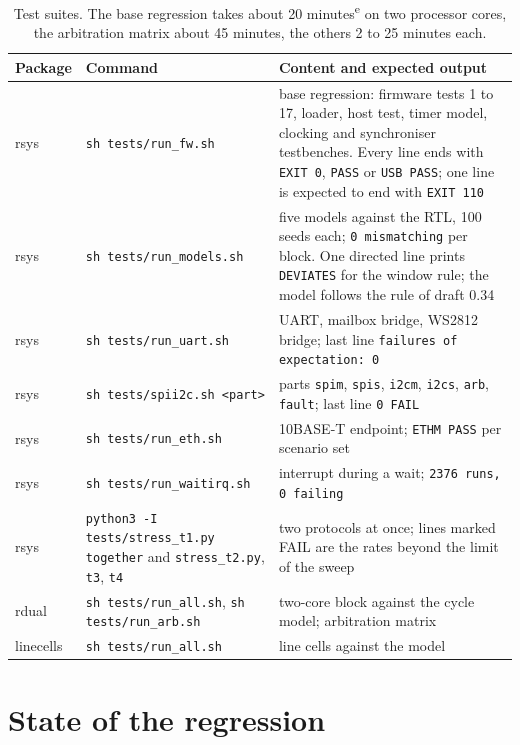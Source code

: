 \documentclass[10pt,a4paper]{article}
\newcommand{\est}{\textsuperscript{e}}
\begin{document}
\begin{table}[H]
\centering\small
\begin{tabularx}{\linewidth}{@{}llL@{}}
\toprule
Package & Command & Content and expected output \\
\midrule
rsys & \texttt{sh tests/run\_fw.sh} & base regression: firmware tests 1 to 17, loader, host test, timer model, clocking and synchroniser testbenches. Every line ends with \texttt{EXIT 0}, \texttt{PASS} or \texttt{USB PASS}; one line is expected to end with \texttt{EXIT 110} \\
rsys & \texttt{sh tests/run\_models.sh} & five models against the RTL, 100 seeds each; \texttt{0 mismatching} per block. One directed line prints \texttt{DEVIATES} for the window rule; the model follows the rule of draft 0.34 \\
rsys & \texttt{sh tests/run\_uart.sh} & UART, mailbox bridge, WS2812 bridge; last line \texttt{failures of expectation: 0} \\
rsys & \texttt{sh tests/spii2c.sh <part>} & parts \texttt{spim}, \texttt{spis}, \texttt{i2cm}, \texttt{i2cs}, \texttt{arb}, \texttt{fault}; last line \texttt{0 FAIL} \\
rsys & \texttt{sh tests/run\_eth.sh} & 10BASE-T endpoint; \texttt{ETHM PASS} per scenario set \\
rsys & \texttt{sh tests/run\_waitirq.sh} & interrupt during a wait; \texttt{2376 runs, 0 failing} \\
rsys & \texttt{python3 -I tests/stress\_t1.py together} and \texttt{stress\_t2.py}, \texttt{t3}, \texttt{t4} & two protocols at once; lines marked FAIL are the rates beyond the limit of the sweep \\
rdual & \texttt{sh tests/run\_all.sh}, \texttt{sh tests/run\_arb.sh} & two-core block against the cycle model; arbitration matrix \\
linecells & \texttt{sh tests/run\_all.sh} & line cells against the model \\
\bottomrule
\end{tabularx}
\caption{Test suites. The base regression takes about 20 minutes\est{} on two processor cores, the arbitration
matrix about 45 minutes, the others 2 to 25 minutes each.}
\end{table}

\section{State of the regression}\label{sec:state}
\end{document}
